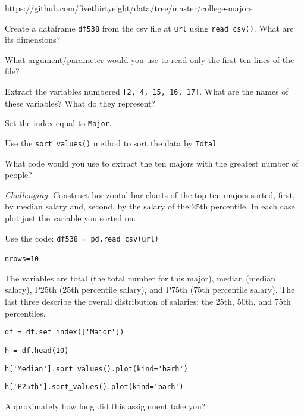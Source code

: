 \documentclass[11pt]{exam}
\begin{document}
\begin{questions}
\vspace{0.1in}
\centerline{\url{https://github.com/fivethirtyeight/data/tree/master/college-majors}}
\vspace{0.1in}

\begin{parts}

\item Create a dataframe {\tt df538} from the csv file at {\tt url} using
\verb|read_csv()|.
What are its dimensions?

\item What argument/parameter would you use to read only
the first ten lines of the file?

\item Extract the variables numbered \texttt{[2, 4, 15, 16, 17]}.
What are the names of these variables?
What do they represent?

\item Set the index equal to {\tt Major}.

\item Use the \verb|sort_values()| method to sort the data by {\tt Total}.

\item What code would you use to extract the ten majors with the greatest number of people?

\item {\it Challenging.\/}
Construct horizontal bar charts of the top ten majors sorted, first, by median salary
and, second, by the salary of the 25th percentile.
In each case plot just the variable you sorted on.
\end{parts}

\begin{solution}
\begin{parts}
\item Use the code:  \verb|df538 = pd.read_csv(url)|

\item {\tt nrows=10}.

\item The variables are total (the total number for this major),
median (median salary), P25th (25th percentile salary),
and P75th (75th percentile salary).
The last three describe the overall distribution of salaries:
the 25th, 50th, and 75th percentiles.

\item \verb|df = df.set_index(['Major'])|

\item \verb|h = df.head(10)|

\item \verb|h['Median'].sort_values().plot(kind='barh')|
\item \verb|h['P25th'].sort_values().plot(kind='barh')|

\end{parts}
\end{solution}

\item Approximately how long did this assignment take you?

\end{questions}




\end{document}
